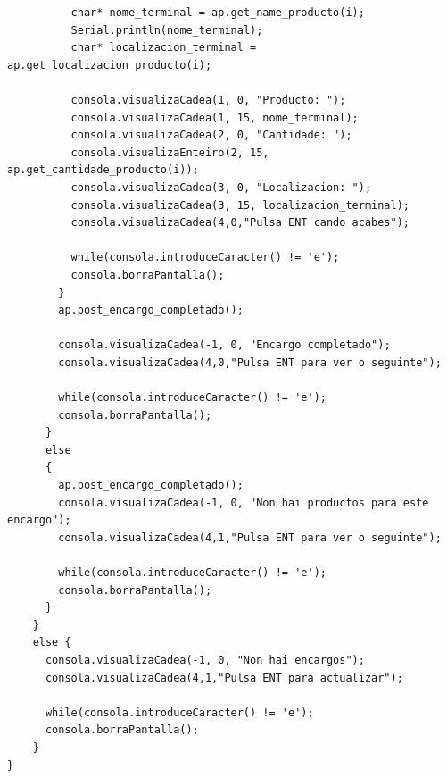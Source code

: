 \documentclass[11pt,twoside]{book}
\begin{document}
\begin{lstlisting}
          char* nome_terminal = ap.get_name_producto(i);
          Serial.println(nome_terminal);
          char* localizacion_terminal = ap.get_localizacion_producto(i);

          consola.visualizaCadea(1, 0, "Producto: ");
          consola.visualizaCadea(1, 15, nome_terminal);
          consola.visualizaCadea(2, 0, "Cantidade: ");
          consola.visualizaEnteiro(2, 15, ap.get_cantidade_producto(i));
          consola.visualizaCadea(3, 0, "Localizacion: ");
          consola.visualizaCadea(3, 15, localizacion_terminal);
          consola.visualizaCadea(4,0,"Pulsa ENT cando acabes");

          while(consola.introduceCaracter() != 'e');
          consola.borraPantalla();
        }
        ap.post_encargo_completado();

        consola.visualizaCadea(-1, 0, "Encargo completado");
        consola.visualizaCadea(4,0,"Pulsa ENT para ver o seguinte");

        while(consola.introduceCaracter() != 'e');
        consola.borraPantalla();
      }
      else
      {
        ap.post_encargo_completado();
        consola.visualizaCadea(-1, 0, "Non hai productos para este encargo");
        consola.visualizaCadea(4,1,"Pulsa ENT para ver o seguinte");

        while(consola.introduceCaracter() != 'e');
        consola.borraPantalla();
      }
    }
    else {
      consola.visualizaCadea(-1, 0, "Non hai encargos");
      consola.visualizaCadea(4,1,"Pulsa ENT para actualizar");

      while(consola.introduceCaracter() != 'e');
      consola.borraPantalla();
    }
}

\end{lstlisting}

\stopcontents[parts]

\cleardoublepage

\renewcommand{\documento}{Pliego de condicións}
\end{document}
